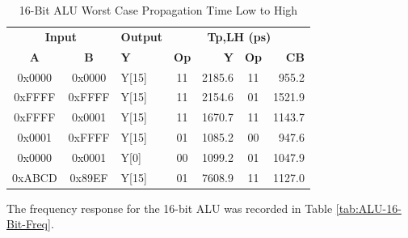 \documentclass[11pt]{article}
\begin{document}
		
			\begin{table}[H]
				\centering
				\caption{16-Bit ALU Worst Case Propagation Time Low to High}
				\label{tab:ALU-16-Bit-Tpd-LH}
				\begin{tabular}{|cclcrcr|}
					\hline
					\multicolumn{2}{|c}{\textbf{Input}} & \textbf{Output} & \multicolumn{4}{c|}{\textbf{Tp,LH (ps)}} \\
					\textbf{A} & \textbf{B} & \textbf{Y} & \textbf{Op} & \textbf{Y} & \textbf{Op} & \textbf{CB} \\
					\hline
					0x0000 & 0x0000 & Y{[}15{]} & 11 & 2185.6 & 11 & 955.2 \\
					0xFFFF & 0xFFFF & Y{[}15{]} & 11 & 2154.6 & 01 & 1521.9 \\
					0xFFFF & 0x0001 & Y{[}15{]} & 11 & 1670.7 & 11 & 1143.7 \\
					0x0001 & 0xFFFF & Y{[}15{]} & 01 & 1085.2 & 00 & 947.6 \\
					0x0000 & 0x0001 & Y{[}0{]} & 00 & 1099.2 & 01 & 1047.9 \\
					0xABCD & 0x89EF & Y{[}15{]} & 01 & 7608.9 & 11 & 1127.0 \\
					\hline
				\end{tabular}
			\end{table}
		
			The frequency response for the 16-bit ALU was recorded in Table \ref{tab:ALU-16-Bit-Freq}.
		
\end{document}
